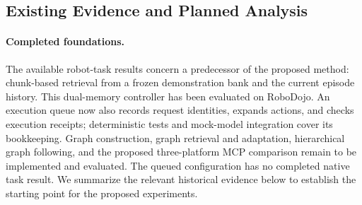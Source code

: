 \documentclass[10pt,twocolumn,letterpaper]{article}
\begin{document}


\subsection{Existing Evidence and Planned Analysis}
\label{sec:evidence-analysis}

\paragraph{Completed foundations.}
The available robot-task results concern a predecessor of the proposed method: chunk-based retrieval from a frozen demonstration bank and the current episode history. This dual-memory controller has been evaluated on RoboDojo. An execution queue now also records request identities, expands actions, and checks execution receipts; deterministic tests and mock-model integration cover its bookkeeping. Graph construction, graph retrieval and adaptation, hierarchical graph following, and the proposed three-platform MCP comparison remain to be implemented and evaluated. The queued configuration has no completed native task result. We summarize the relevant historical evidence below to establish the starting point for the proposed experiments.
\end{document}
